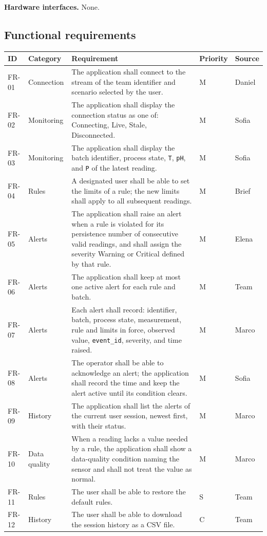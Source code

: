 \documentclass[10pt,a4paper]{article}
\newcommand{\head}[1]{\textbf{\color{courseblue}#1}}
\newcommand{\field}[1]{\texttt{#1}}
\begin{document}
\textbf{Hardware interfaces.} None.

\subsection{Functional requirements}
\begin{longtable}{@{}L{14mm}L{24mm}L{79mm}L{14mm}L{17mm}@{}}
\toprule \head{ID} & \head{Category} & \head{Requirement} & \head{Priority} & \head{Source}\\ \midrule \endhead
FR-01 & Connection & The application shall connect to the stream of the team identifier and scenario selected by the user. & M & Daniel\\
FR-02 & Monitoring & The application shall display the connection status as one of: Connecting, Live, Stale, Disconnected. & M & Sofia\\
FR-03 & Monitoring & The application shall display the batch identifier, process state, \field{T}, \field{pH}, and \field{P} of the latest reading. & M & Sofia\\
FR-04 & Rules & A designated user shall be able to set the limits of a rule; the new limits shall apply to all subsequent readings. & M & Brief\\
FR-05 & Alerts & The application shall raise an alert when a rule is violated for its persistence number of consecutive valid readings, and shall assign the severity Warning or Critical defined by that rule. & M & Elena\\
FR-06 & Alerts & The application shall keep at most one active alert for each rule and batch. & M & Team\\
FR-07 & Alerts & Each alert shall record: identifier, batch, process state, measurement, rule and limits in force, observed value, \field{event\_id}, severity, and time raised. & M & Marco\\
FR-08 & Alerts & The operator shall be able to acknowledge an alert; the application shall record the time and keep the alert active until its condition clears. & M & Sofia\\
FR-09 & History & The application shall list the alerts of the current user session, newest first, with their status. & M & Marco\\
FR-10 & Data quality & When a reading lacks a value needed by a rule, the application shall show a data-quality condition naming the sensor and shall not treat the value as normal. & M & Marco\\
FR-11 & Rules & The user shall be able to restore the default rules. & S & Team\\
FR-12 & History & The user shall be able to download the session history as a CSV file. & C & Team\\
\bottomrule
\end{longtable}
\end{document}
